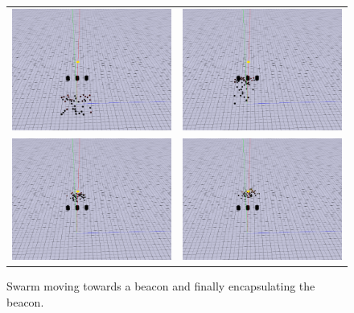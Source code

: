 \documentclass[a4paper, 10pt, conference]{ieeeconf}
\begin{document}
  \begin{figure}[!htbp]
    \begin{center}
      \begin{tabular}{lr}
        \includegraphics[width=6cm]{figures/40_beta1.png}   &
        \includegraphics[width=6cm]{figures/40_beta2.png}  \\
        \includegraphics[width=6cm]{figures/40_beta7.png}  &
        \includegraphics[width=6cm]{figures/40_beta8.png} \\
      \end{tabular}
      \caption{Swarm moving towards a beacon and finally encapsulating the beacon.}
      \label{fig:snaps}
    \end{center}
  \end{figure}
\end{document}
